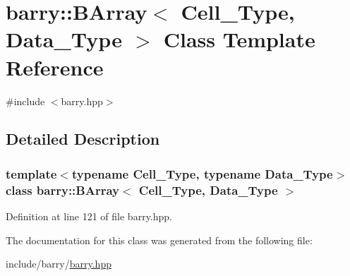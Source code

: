 \hypertarget{classbarry_1_1_b_array}{}\section{barry\+:\+:B\+Array$<$ Cell\+\_\+\+Type, Data\+\_\+\+Type $>$ Class Template Reference}
\label{classbarry_1_1_b_array}


{\ttfamily \#include $<$barry.\+hpp$>$}



\subsection{Detailed Description}
\subsubsection*{template$<$typename Cell\+\_\+\+Type, typename Data\+\_\+\+Type$>$\newline
class barry\+::\+B\+Array$<$ Cell\+\_\+\+Type, Data\+\_\+\+Type $>$}



Definition at line 121 of file barry.\+hpp.



The documentation for this class was generated from the following file\+:\begin{DoxyCompactItemize}
\item 
include/barry/\hyperlink{barry_8hpp}{barry.\+hpp}\end{DoxyCompactItemize}
